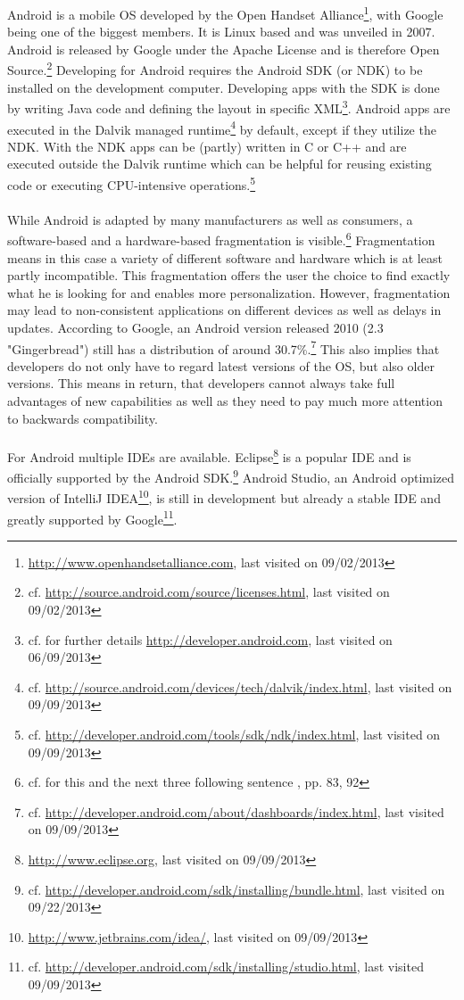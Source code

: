\vspace{0.75em}
Android is a mobile OS developed by the Open Handset Alliance\footnote{\url{http://www.openhandsetalliance.com}, last visited on 09/02/2013}, with Google being one of the biggest members. It is Linux based and was unveiled in 2007. Android is released by Google under the Apache License and is therefore Open Source.\footnote{cf. \url{http://source.android.com/source/licenses.html}, last visited on 09/02/2013} Developing for Android requires the Android SDK (or NDK) to be installed on the development computer. Developing apps with the SDK is done by writing Java code and defining the layout in specific XML\footnote{cf. for further details \url{http://developer.android.com}, last visited on 06/09/2013}. Android apps are executed in the Dalvik managed runtime\footnote{cf. \url{http://source.android.com/devices/tech/dalvik/index.html}, last visited on 09/09/2013} by default, except if they utilize the NDK. With the NDK apps can be (partly) written in C or C++ and are executed outside the Dalvik runtime which can be helpful for reusing existing code or executing CPU-intensive operations.\footnote{cf. \url{http://developer.android.com/tools/sdk/ndk/index.html}, last visited on 09/09/2013}
\\
\\
While Android is adapted by many manufacturers as well as consumers, a software-based and a hardware-based fragmentation is visible.\footnote{cf. for this and the next three following sentence \cite{DanHan.2012}, pp. 83, 92} Fragmentation means in this case a variety of different software and hardware which is at least partly incompatible. This fragmentation offers the user the choice to find exactly what he is looking for and enables more personalization. However, fragmentation may lead to non-consistent applications on different devices as well as delays in updates. According to Google, an Android version released 2010 (2.3 "Gingerbread") still has a distribution of around 30.7\%.\footnote{cf. \url{http://developer.android.com/about/dashboards/index.html}, last visited on 09/09/2013} This also implies that developers do not only have to regard latest versions of the OS, but also older versions. This means in return, that developers cannot always take full advantages of new capabilities as well as they need to pay much more attention to backwards compatibility.
\\
\\
For Android multiple IDEs are available. Eclipse\footnote{\url{http://www.eclipse.org}, last visited on 09/09/2013} is a popular IDE and is officially supported by the Android SDK.\footnote{cf. \url{http://developer.android.com/sdk/installing/bundle.html}, last visited on 09/22/2013} Android Studio, an Android optimized version of IntelliJ IDEA\footnote{\url{http://www.jetbrains.com/idea/}, last visited on 09/09/2013}, is still in development but already a stable IDE and greatly supported by Google\footnote{cf. \url{http://developer.android.com/sdk/installing/studio.html}, last visited 09/09/2013}.
